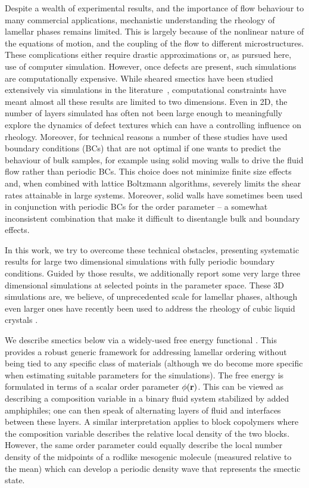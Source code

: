 \documentclass[8.5pt,twoside,twocolumn]{article}
\begin{document}
Despite a wealth of experimental results, and the importance of flow behaviour
to many commercial applications, mechanistic understanding
the rheology of lamellar phases remains limited. This is largely
because of the nonlinear nature of the equations of motion, and the
coupling of the flow to different microstructures. These complications either require
drastic approximations or, as pursued here, use of computer
simulation. However, once defects are present, such simulations are computationally expensive. 
While sheared smectics have been studied extensively via simulations
in the literature~\cite{Swift96,Gonnella97,Gonnella98,Xu03,Xu05,Xu06a,Xu06b},
computational constraints have meant almost all these results are limited
to two dimensions. Even in 2D, the number of layers simulated has often not been large enough to meaningfully explore the dynamics of defect textures which can have a controlling influence on rheology. Moreover, for technical reasons a number of these studies have used boundary conditions (BCs) that are not optimal if one wants to predict the behaviour of bulk samples, for example using solid moving walls to drive the fluid flow rather than periodic BCs. This choice does not minimize finite size effects and, when combined with lattice Boltzmann algorithms, severely limits the shear rates attainable in large systems. Moreover, solid walls have sometimes been used in conjunction with periodic BCs for the order parameter \cite{Xu06b} -- a somewhat inconsistent combination that make it difficult to disentangle bulk and boundary effects. 

In this work, we try to overcome these technical obstacles, presenting systematic results for large two dimensional simulations with fully periodic boundary conditions.
Guided by those results, we additionally report some very large three dimensional simulations at selected points in the parameter space. These 3D simulations are, we believe, of unprecedented scale for lamellar phases, although even larger ones have recently been used to address the rheology of cubic liquid crystals \cite{Saksena09a, Saksena09b}.

We describe smectics below via a widely-used free energy functional \cite{Gompper, Gonnella97, Xu06b, Cencini07}. This provides a robust generic framework for addressing lamellar ordering without being tied to any specific class of materials (although we do become more specific when estimating suitable parameters for the simulations). The free energy is formulated in terms of a scalar order parameter $\phi({\bf r})$. This can be viewed as describing a composition variable in a binary fluid system stabilized by added amphiphiles; one can then speak of alternating layers of fluid and interfaces between these layers. A similar interpretation applies to block copolymers where the composition variable describes the relative local density of the two blocks. However, the same order parameter could equally describe the local number density of the midpoints of a rodlike mesogenic molecule (measured relative to the mean) which can develop a periodic density wave that represents the smectic state.
\end{document}
